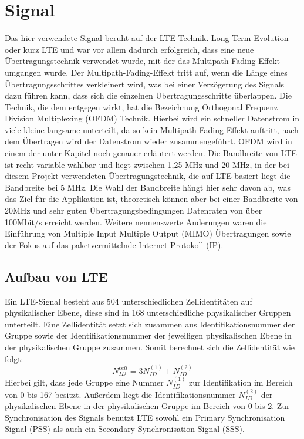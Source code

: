 \section{Signal}
Das hier verwendete Signal beruht auf der LTE Technik. Long Term Evolution oder kurz LTE und war vor allem dadurch erfolgreich, dass eine neue Übertragungstechnik verwendet wurde, mit der das Multipath-Fading-Effekt umgangen wurde. Der Multipath-Fading-Effekt tritt auf, wenn die Länge eines Übertragungsschrittes verkleinert wird, was bei einer Verzögerung des Signals dazu führen kann, dass sich die einzelnen Übertragungsschritte überlappen. Die Technik, die dem entgegen wirkt, hat die Bezeichnung Orthogonal Frequenz Division Multiplexing (OFDM) Technik. Hierbei wird ein schneller Datenstrom in viele kleine langsame unterteilt, da so kein Multipath-Fading-Effekt auftritt, nach dem Übertragen wird der Datenstrom wieder zusammengeführt. OFDM wird in einem der unter Kapitel noch genauer erläutert werden. Die Bandbreite von LTE ist recht variable wählbar und liegt zwischen 1,25 MHz und 20 MHz, in der bei diesem Projekt verwendeten Übertragungstechnik, die auf LTE basiert liegt die Bandbreite bei 5 MHz. Die Wahl der Bandbreite hängt hier sehr davon ab, was das Ziel für die Applikation ist, theoretisch können aber bei einer Bandbreite von 20MHz und sehr guten Übertragungsbedingungen Datenraten von über 100Mbit/s erreicht werden. Weitere nennenswerte Änderungen waren die Einführung von Multiple Input Multiple Output (MIMO) Übertragungen sowie der Fokus auf das paketvermittelnde Internet-Protokoll (IP).~\cite[S.205f]{Sauter2018}

\subsection{Aufbau von LTE}
Ein LTE-Signal besteht aus 504 unterschiedlichen Zellidentitäten auf physikalischer Ebene, diese sind in 168 unterschiedliche physikalischer Gruppen unterteilt. Eine Zellidentität setzt sich zusammen aus Identifikationsnummer der Gruppe sowie der Identifikationsnummer der jeweiligen physikalischen Ebene in der physikalischen Gruppe zusammen. Somit berechnet sich die Zellidentität wie folgt:
\begin{equation}
    N_{ID}^{cell}=3N_{ID}^{(1)}+N_{ID}^{(2)}
\end{equation}
Hierbei gilt, dass jede Gruppe eine Nummer $N_{ID}^{(1)}$ zur Identifikation im Bereich von 0 bis 167 besitzt. Außerdem liegt die Identifikationsnummer $N_{ID}^{(2)}$ der physikalischen Ebene in der physikalischen Gruppe im Bereich von 0 bis 2.
Zur Synchronisation des Signals benutzt LTE sowohl ein Primary Synchronisation Signal (PSS) als auch ein Secondary Synchronisation Signal (SSS).~\cite[S.~180]{etsi2021136}

